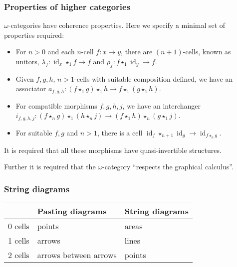 \documentclass[presentation]{beamer}
\DeclareMathOperator{\id}{id}
\newcommand{\inv}[1]{#1^{-1}}
\newcommand{\comp}{\star}
\begin{document}
\begin{frame}
  \frametitle{Properties of higher categories}

  \(\omega\)-categories have coherence properties. Here we specify a minimal set of properties required:
  \begin{itemize}
  \item For \(n>0\) and each \(n\)-cell \(f: x \to y\), there are \((n+1)\)-cells, known as unitors, \(\lambda_f: \id_x \comp_1 f \to f\) and \(\rho_f: f \comp_1 \id_y \to f\).
  \item Given \(f,g,h\), \(n>1\)-cells with suitable composition defined, we have an associator \(a_{f,g,h} : (f \comp_1 g) \comp_1 h \to f \comp_1 (g \comp_1 h)\).
  \item For compatible morphisms \(f,g,h,j\), we have an interchanger \(i_{f,g,h,j} : (f \comp_n g) \comp_1 (h \comp_n j) \to (f \comp_1 h) \comp_n (g \comp_1 j)\).
  \item For suitable \(f,g\) and \(n > 1\), there is a cell \(\id_f \comp_{n+1} \id_g \to \id_{f \comp_n g}\).
  \end{itemize}
  \pause{}
  It is required that all these morphisms have quasi-invertible structures.

  \pause{}
  Further it is required that the \(\omega\)-category ``respects the graphical calculus''.
\end{frame}

\begin{frame}[fragile]
  \frametitle{String diagrams}
  \begin{table}[]
    \begin{tabular}{lll}
      & Pasting diagrams      & String diagrams \\
      \hline
      0 cells & points                & areas           \\
      1 cells & arrows                & lines           \\
      2 cells & arrows between arrows & points
    \end{tabular}
  \end{table}
  \pause{}
  \begin{center}
  \end{center}
\end{frame}
\end{document}
